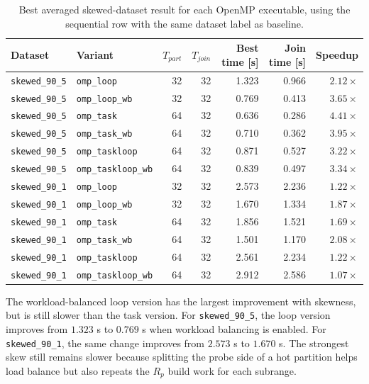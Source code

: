 \documentclass[11pt,a4paper]{article}
\begin{document}
\begin{table}[H]
    \centering
    \scriptsize
    \begin{tabular}{llrrrrr}
        \toprule
        Dataset & Variant & \(T_{part}\) & \(T_{join}\) & Best time [s] & Join time [s] & Speedup \\
        \midrule
        \texttt{skewed\_90\_5} & \texttt{omp\_loop} & 32 & 32 & 1.323 & 0.966 & \(2.12\times\) \\
        \texttt{skewed\_90\_5} & \texttt{omp\_loop\_wb} & 32 & 32 & 0.769 & 0.413 & \(3.65\times\) \\
        \texttt{skewed\_90\_5} & \texttt{omp\_task} & 64 & 32 & 0.636 & 0.286 & \(4.41\times\) \\
        \texttt{skewed\_90\_5} & \texttt{omp\_task\_wb} & 64 & 32 & 0.710 & 0.362 & \(3.95\times\) \\
        \texttt{skewed\_90\_5} & \texttt{omp\_taskloop} & 64 & 32 & 0.871 & 0.527 & \(3.22\times\) \\
        \texttt{skewed\_90\_5} & \texttt{omp\_taskloop\_wb} & 64 & 32 & 0.839 & 0.497 & \(3.34\times\) \\
        \midrule
        \texttt{skewed\_90\_1} & \texttt{omp\_loop} & 32 & 32 & 2.573 & 2.236 & \(1.22\times\) \\
        \texttt{skewed\_90\_1} & \texttt{omp\_loop\_wb} & 32 & 32 & 1.670 & 1.334 & \(1.87\times\) \\
        \texttt{skewed\_90\_1} & \texttt{omp\_task} & 64 & 32 & 1.856 & 1.521 & \(1.69\times\) \\
        \texttt{skewed\_90\_1} & \texttt{omp\_task\_wb} & 64 & 32 & 1.501 & 1.170 & \(2.08\times\) \\
        \texttt{skewed\_90\_1} & \texttt{omp\_taskloop} & 64 & 32 & 2.561 & 2.234 & \(1.22\times\) \\
        \texttt{skewed\_90\_1} & \texttt{omp\_taskloop\_wb} & 64 & 32 & 2.912 & 2.586 & \(1.07\times\) \\
        \bottomrule
    \end{tabular}
    \caption{Best averaged skewed-dataset result for each OpenMP executable, using the sequential row with the same dataset label as baseline.}
    \label{tab:skewed-best}
\end{table}

The workload-balanced loop version has the largest improvement with skewness, but is still slower than the task version. For \texttt{skewed\_90\_5}, the loop version improves from \(1.323\) s to \(0.769\) s when workload balancing is enabled. For \texttt{skewed\_90\_1}, the same change improves from \(2.573\) s to \(1.670\) s. The strongest skew still remains slower because splitting the probe side of a hot partition helps load balance but also repeats the \(R_p\) build work for each subrange.
\end{document}
